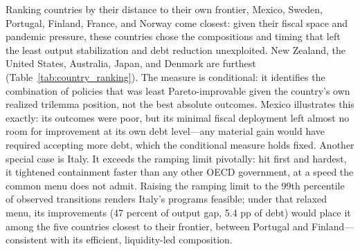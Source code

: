 \documentclass[12pt, a4paper]{article}
\begin{document}
Ranking countries by their distance to their own frontier, Mexico, Sweden,
Portugal, Finland, France, and Norway come closest: given their fiscal space
and pandemic pressure, these countries chose the compositions and timing
that left the least output stabilization and debt reduction unexploited. New
Zealand, the United States, Australia, Japan, and Denmark are furthest
(Table~\ref{tab:country_ranking}). The measure is conditional: it identifies
the combination of policies that was least Pareto-improvable given the
country's own realized trilemma position, not the best absolute outcomes.
Mexico illustrates this exactly: its outcomes were poor, but its minimal
fiscal deployment left almost no room for improvement at its own debt
level---any material gain would have required accepting more debt, which the
conditional measure holds fixed. Another special case is Italy. It exceeds
the ramping limit pivotally: hit first and hardest, it tightened containment
faster than any other OECD government, at a speed the common menu does not
admit. Raising the ramping limit to the 99th percentile of observed
transitions renders Italy's programs feasible; under that relaxed menu, its
improvements (47 percent of output gap, 5.4 pp of debt) would place
it among the five countries closest to their frontier, between Portugal and
Finland---consistent with its efficient, liquidity-led composition.
\end{document}
